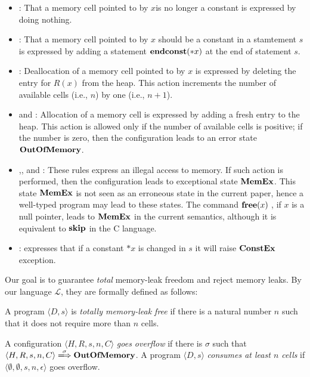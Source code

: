 \begin{itemize}
\item {}: That a memory cell pointed to by \(x\)is no
  longer a constant is expressed by doing nothing.
\item {}: That a memory cell pointed to by \(x\) should
  be a constant in a stamtement \(s\) is expressed by adding a
  statement \(\mathbf{endconst}(*x)\) at the end of statement \(s\).
\item {}: Deallocation of a memory cell pointed to by \(x\)
  is expressed by deleting the entry for \(R(x)\) from the heap.  This
  action increments the number of available cells (i.e., \(n\)) by one
  (i.e., \(n+1\)).
\item {} and : Allocation of a memory
  cell is expressed by adding a fresh entry to the heap.  This action is
  allowed only if the number of available cells is positive; if the
  number is zero, then the configuration leads to an error state
  \(\mathbf{OutOfMemory}\).
\item {},, and
   : These rules express an illegal access to memory.
  If such action is performed, then the configuration leads to
  exceptional state \(\mathbf{MemEx}\).  This state \(\mathbf{MemEx}\) is not seen as
  an erroneous state in the current paper, hence a well-typed program
  may lead to these states.  The command \(\mathbf{free}(x)\;\), if \(x\) is a null
  pointer, leads to \(\mathbf{MemEx}\) in the current semantics, although it
  is equivalent to \(\mathbf{skip}\) in the C language.
\item {}:  expresses that if a constant \(*x\)
  is changed in \(s\) it will raise \(\mathbf{ConstEx}\) exception.
\end{itemize}

Our goal is to guarantee \emph{total} memory-leak freedom and reject
memory leaks. By our language \(\mathcal{L}\), they are formally
defined as follows:
\begin{myDef}
\label{df:ml}
A program \(\langle D, s \rangle\) is \emph{totally memory-leak free}
if there is a natural number \(n\) such that it does not require more
than \(n\) cells.
\end{myDef}
\begin{myDef}
\label{df:ml}
A configuration \(\langle H, R, s, n, C \rangle\) \emph{goes overflow} if
there is \(\sigma\) such that \(\langle H, R, s, n, C \rangle
\xLongrightarrow{\sigma} \OVERFLOW\).  A program \(\langle D, s
\rangle\) \emph{consumes at least \(n\) cells} if \(\langle \emptyset,
\emptyset, s, n, \epsilon \rangle\) goes overflow.  
\end{myDef}



